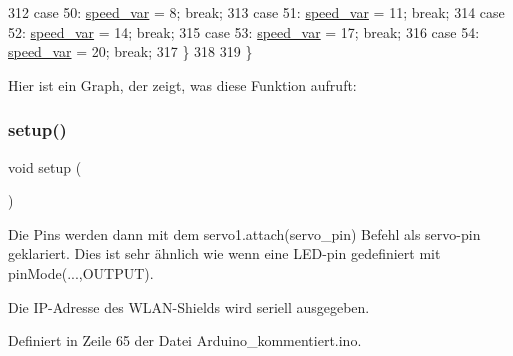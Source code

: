 \begin{DoxyCode}
312     \textcolor{keywordflow}{case} 50: \hyperlink{_arduino__kommentiert_8ino_a8b03f5396d8e845086daab48dcaca5cb}{speed\_var} = 8;  \textcolor{keywordflow}{break};
313     \textcolor{keywordflow}{case} 51: \hyperlink{_arduino__kommentiert_8ino_a8b03f5396d8e845086daab48dcaca5cb}{speed\_var} = 11; \textcolor{keywordflow}{break};
314     \textcolor{keywordflow}{case} 52: \hyperlink{_arduino__kommentiert_8ino_a8b03f5396d8e845086daab48dcaca5cb}{speed\_var} = 14; \textcolor{keywordflow}{break};
315     \textcolor{keywordflow}{case} 53: \hyperlink{_arduino__kommentiert_8ino_a8b03f5396d8e845086daab48dcaca5cb}{speed\_var} = 17; \textcolor{keywordflow}{break};
316     \textcolor{keywordflow}{case} 54: \hyperlink{_arduino__kommentiert_8ino_a8b03f5396d8e845086daab48dcaca5cb}{speed\_var} = 20; \textcolor{keywordflow}{break};
317   \}
318 
319 \}
\end{DoxyCode}
Hier ist ein Graph, der zeigt, was diese Funktion aufruft\+:
\mbox{\label{_arduino__kommentiert_8ino_a4fc01d736fe50cf5b977f755b675f11d}} 
\subsubsection{\texorpdfstring{setup()}{setup()}}
{\footnotesize\ttfamily void setup (\begin{DoxyParamCaption}{ }\end{DoxyParamCaption})}

Die Pins werden dann mit dem servo1.\+attach(servo\+\_\+pin) Befehl als servo-\/pin geklariert. Dies ist sehr ähnlich wie wenn eine L\+E\+D-\/pin gedefiniert mit pin\+Mode(...,O\+U\+T\+P\+UT).

Die I\+P-\/\+Adresse des W\+L\+A\+N-\/\+Shields wird seriell ausgegeben. 

Definiert in Zeile 65 der Datei Arduino\+\_\+kommentiert.\+ino.


